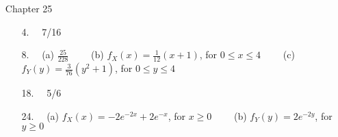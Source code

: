 \documentclass[12pt]{article}
\begin{document}
\begin{itemize}
\begin{itemize}
	\end{itemize}



\item[Chapter 25]           \label{ANS_25}
	\begin{itemize}
	\item[4.]   \ \  7/16
	\item[8.]   \ \  (a)  $\frac{25}{228} $ \ \ \ \ (b) $f_X(x)=\frac{1}{12}(x+1) $, for $0\leq x\leq 4$ \ \ \ \  
	\newline  (c)  $f_Y(y)=\frac{3}{76}(y^2+1) $, for $0\leq y\leq 4$
	\item[18.]   \ \  5/6
	\item[24.]   \ \   (a)  $ f_X(x)=-2e^{-2x}+2e^{-x}  $, for $x\geq 0$ \ \ \ \  
	  (b)  $ f_Y(y)=2e^{-2y}  $, for $ y\geq 0$
	\end{itemize}





\end{itemize}  %
\end{document}

